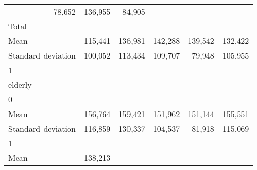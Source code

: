 \begin{tabular}{llllll}
  \multicolumn{1}{r}{78,652} &
  \multicolumn{1}{r}{136,955} &
  \multicolumn{1}{r}{84,905} \\
\multicolumn{1}{l}{\hspace{3em}Total} &
  \multicolumn{1}{|r}{} &
  \multicolumn{1}{r}{} &
  \multicolumn{1}{r}{} &
  \multicolumn{1}{r}{} &
  \multicolumn{1}{r}{} \\
\multicolumn{1}{l}{\hspace{4em}Mean} &
  \multicolumn{1}{|r}{115,441} &
  \multicolumn{1}{r}{136,981} &
  \multicolumn{1}{r}{142,288} &
  \multicolumn{1}{r}{139,542} &
  \multicolumn{1}{r}{132,422} \\
\multicolumn{1}{l}{\hspace{4em}Standard deviation} &
  \multicolumn{1}{|r}{100,052} &
  \multicolumn{1}{r}{113,434} &
  \multicolumn{1}{r}{109,707} &
  \multicolumn{1}{r}{79,948} &
  \multicolumn{1}{r}{105,955} \\
\multicolumn{1}{l}{\hspace{1em}1} &
  \multicolumn{1}{|r}{} &
  \multicolumn{1}{r}{} &
  \multicolumn{1}{r}{} &
  \multicolumn{1}{r}{} &
  \multicolumn{1}{r}{} \\
\multicolumn{1}{l}{\hspace{2em}elderly} &
  \multicolumn{1}{|r}{} &
  \multicolumn{1}{r}{} &
  \multicolumn{1}{r}{} &
  \multicolumn{1}{r}{} &
  \multicolumn{1}{r}{} \\
\multicolumn{1}{l}{\hspace{3em}0} &
  \multicolumn{1}{|r}{} &
  \multicolumn{1}{r}{} &
  \multicolumn{1}{r}{} &
  \multicolumn{1}{r}{} &
  \multicolumn{1}{r}{} \\
\multicolumn{1}{l}{\hspace{4em}Mean} &
  \multicolumn{1}{|r}{156,764} &
  \multicolumn{1}{r}{159,421} &
  \multicolumn{1}{r}{151,962} &
  \multicolumn{1}{r}{151,144} &
  \multicolumn{1}{r}{155,551} \\
\multicolumn{1}{l}{\hspace{4em}Standard deviation} &
  \multicolumn{1}{|r}{116,859} &
  \multicolumn{1}{r}{130,337} &
  \multicolumn{1}{r}{104,537} &
  \multicolumn{1}{r}{81,918} &
  \multicolumn{1}{r}{115,069} \\
\multicolumn{1}{l}{\hspace{3em}1} &
  \multicolumn{1}{|r}{} &
  \multicolumn{1}{r}{} &
  \multicolumn{1}{r}{} &
  \multicolumn{1}{r}{} &
  \multicolumn{1}{r}{} \\
\multicolumn{1}{l}{\hspace{4em}Mean} &
  \multicolumn{1}{|r}{138,213} &

\end{tabular}
